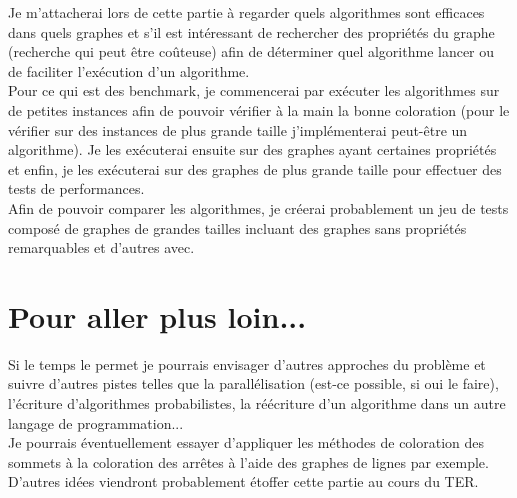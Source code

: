 Je m'attacherai lors de cette partie à regarder quels algorithmes sont efficaces dans quels graphes
et s'il est intéressant de rechercher des propriétés du graphe (recherche qui peut être coûteuse)
afin de déterminer quel algorithme lancer ou de faciliter l'exécution d'un algorithme.\\

Pour ce qui est des benchmark, je commencerai par exécuter les algorithmes sur de petites instances
afin de pouvoir vérifier à la main la bonne coloration (pour le vérifier sur des instances de plus
grande taille j'implémenterai peut-être un algorithme). Je les exécuterai ensuite sur des graphes ayant certaines propriétés et enfin, je les exécuterai sur des graphes de
plus grande taille pour effectuer des tests de performances.\\
Afin de pouvoir comparer les algorithmes, je créerai probablement un jeu de
tests composé de graphes de grandes tailles
incluant des graphes sans propriétés remarquables et d'autres avec.

% 

\section{Pour aller plus loin...}
Si le temps le permet je pourrais envisager d'autres approches du problème et suivre d'autres pistes
telles que la parallélisation (est-ce possible, si oui le faire), l'écriture d'algorithmes probabilistes,
la réécriture d'un algorithme dans un autre langage de programmation...\\
Je pourrais éventuellement essayer d'appliquer les méthodes de coloration des sommets à
la coloration des arrêtes à l'aide des graphes de lignes par exemple.\\

D'autres idées viendront probablement étoffer cette partie au cours du TER. 


